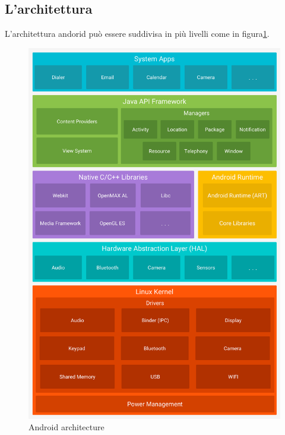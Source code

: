 \subsection{L'architettura}
L'architettura andorid può essere suddivisa in più livelli come in figura\ref{fig:andoridStack}. 
\begin{figure}[h]
\centering 
\includegraphics[width=0.4\linewidth]{imgs/capitolo2/os/android-stack_2x.png}
\caption{Android architecture} 
\label{fig:andoridStack} 
\end{figure}

